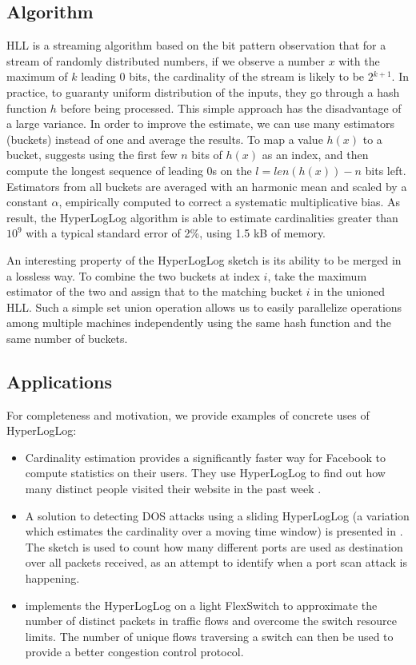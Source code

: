 \documentclass{IEEEtran}
\begin{document}
\subsection{Algorithm}
HLL is a streaming algorithm based on the bit pattern observation that for a stream of randomly distributed numbers, if we observe a number $x$ with the maximum of $k$ leading 0 bits, the cardinality of the stream is likely to be 2$^{k+1}$. In practice, to guaranty uniform distribution of the inputs, they go through a hash function $h$ before being processed. This simple approach has the disadvantage of a large variance. In order to improve the estimate, we can use many estimators (buckets) instead of one and average the results. To map a value $h(x)$ to a bucket, \cite{loglog} suggests using the first few $n$ bits of $h(x)$ as an index, and then compute the longest sequence of leading 0s on the $l = len(h(x)) - n $ bits left. Estimators from all buckets are averaged with an harmonic mean and scaled by a constant $\alpha$, empirically computed to correct a systematic multiplicative bias. As result, the HyperLogLog algorithm is able to estimate cardinalities greater than $10^9$ with a typical standard error of 2\%, using 1.5 kB of memory.

An interesting property of the HyperLogLog sketch is its ability to be merged in a lossless way. To combine the two buckets at index $i$, take the maximum estimator of the two and assign that to the matching bucket $i$ in the unioned HLL. Such a simple set union operation allows us to easily parallelize operations among multiple machines independently using the same hash function and the same number of buckets.

\subsection{Applications}
For completeness and motivation, we provide examples of concrete uses of HyperLogLog:
\begin{itemize}
    \item Cardinality estimation provides a significantly faster way for Facebook to compute statistics on their users. They use HyperLogLog to find out how many distinct people visited their website in the past week \cite{fbhll}.
    \item A solution to detecting DOS attacks using a sliding HyperLogLog \cite{slidinghll} (a variation which estimates the cardinality over a moving time window) is presented in \cite{portscanhll}. The sketch is used to count how many different ports are used as destination over all packets received, as an attempt to identify when a port scan attack is happening.
    \item \cite{flexswitch} implements the HyperLogLog on a light FlexSwitch to approximate the number of distinct packets in traffic flows and overcome the switch resource limits. The number of unique flows traversing a switch can then be used to provide a better congestion control protocol.
\end{itemize}
\end{document}
